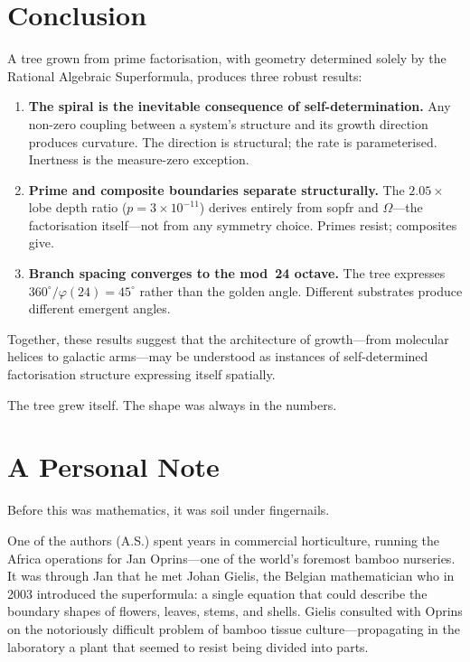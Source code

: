 \documentclass[11pt,a4paper]{article}
\begin{document}
\section{Conclusion}

A tree grown from prime factorisation, with geometry determined solely by the Rational Algebraic Superformula, produces three robust results:

\begin{enumerate}
    \item \textbf{The spiral is the inevitable consequence of self-determination.} Any non-zero coupling between a system's structure and its growth direction produces curvature. The direction is structural; the rate is parameterised. Inertness is the measure-zero exception.

    \item \textbf{Prime and composite boundaries separate structurally.} The $2.05\times$ lobe depth ratio ($p = 3 \times 10^{-11}$) derives entirely from sopfr and $\Omega$---the factorisation itself---not from any symmetry choice. Primes resist; composites give.

    \item \textbf{Branch spacing converges to the mod~24 octave.} The tree expresses $360^\circ/\varphi(24) = 45^\circ$ rather than the golden angle. Different substrates produce different emergent angles.
\end{enumerate}

Together, these results suggest that the architecture of growth---from molecular helices to galactic arms---may be understood as instances of self-determined factorisation structure expressing itself spatially.

The tree grew itself. The shape was always in the numbers.

\section*{A Personal Note}

Before this was mathematics, it was soil under fingernails.

One of the authors (A.S.) spent years in commercial horticulture, running the Africa operations for Jan Oprins---one of the world's foremost bamboo nurseries. It was through Jan that he met Johan Gielis, the Belgian mathematician who in 2003 introduced the superformula: a single equation that could describe the boundary shapes of flowers, leaves, stems, and shells. Gielis consulted with Oprins on the notoriously difficult problem of bamboo tissue culture---propagating in the laboratory a plant that seemed to resist being divided into parts.
\end{document}
